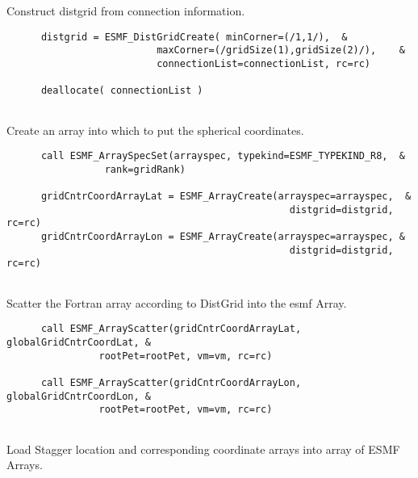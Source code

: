 
    Construct distgrid from connection information. 

 \begin{verbatim}
      distgrid = ESMF_DistGridCreate( minCorner=(/1,1/),  &
                          maxCorner=(/gridSize(1),gridSize(2)/),    &
                          connectionList=connectionList, rc=rc)  

      deallocate( connectionList )
 
\end{verbatim}
 

    Create an array into which to put the spherical coordinates.
  

 \begin{verbatim}
      call ESMF_ArraySpecSet(arrayspec, typekind=ESMF_TYPEKIND_R8,  &
                 rank=gridRank)

      gridCntrCoordArrayLat = ESMF_ArrayCreate(arrayspec=arrayspec,  &
                                                 distgrid=distgrid, rc=rc)
      gridCntrCoordArrayLon = ESMF_ArrayCreate(arrayspec=arrayspec, &
                                                 distgrid=distgrid, rc=rc)
 
\end{verbatim}
 

    Scatter the Fortran array according to DistGrid into the esmf Array. 

 \begin{verbatim}
      call ESMF_ArrayScatter(gridCntrCoordArrayLat, globalGridCntrCoordLat, &
                rootPet=rootPet, vm=vm, rc=rc)    

      call ESMF_ArrayScatter(gridCntrCoordArrayLon, globalGridCntrCoordLon, &
                rootPet=rootPet, vm=vm, rc=rc)    
 
\end{verbatim}
 

   Load Stagger location and corresponding coordinate arrays into array of ESMF Arrays. 

